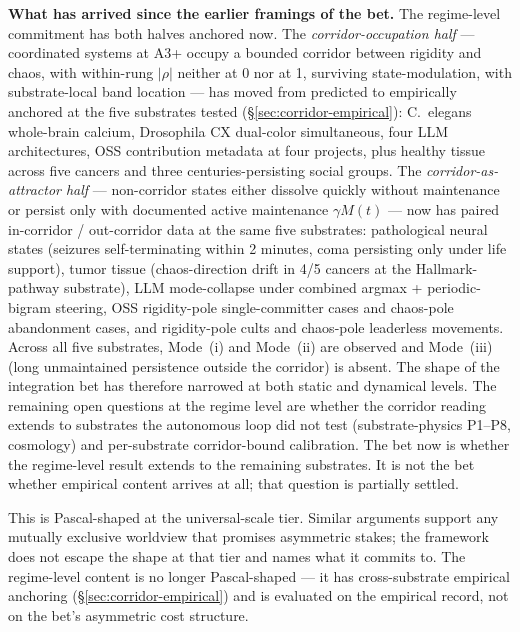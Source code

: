 \documentclass[11pt,a4paper]{article}
\begin{document}
\textbf{What has arrived since the earlier framings of the bet.} The regime-level commitment has both halves anchored now. The \emph{corridor-occupation half} --- coordinated systems at A3+ occupy a bounded corridor between rigidity and chaos, with within-rung $|\rho|$ neither at 0 nor at 1, surviving state-modulation, with substrate-local band location --- has moved from predicted to empirically anchored at the five substrates tested (\S\ref{sec:corridor-empirical}): C.~elegans whole-brain calcium, Drosophila CX dual-color simultaneous, four LLM architectures, OSS contribution metadata at four projects, plus healthy tissue across five cancers and three centuries-persisting social groups. The \emph{corridor-as-attractor half} --- non-corridor states either dissolve quickly without maintenance or persist only with documented active maintenance $\gamma M(t)$ --- now has paired in-corridor / out-corridor data at the same five substrates: pathological neural states (seizures self-terminating within 2 minutes, coma persisting only under life support), tumor tissue (chaos-direction drift in 4/5 cancers at the Hallmark-pathway substrate), LLM mode-collapse under combined argmax + periodic-bigram steering, OSS rigidity-pole single-committer cases and chaos-pole abandonment cases, and rigidity-pole cults and chaos-pole leaderless movements. Across all five substrates, Mode~(i) and Mode~(ii) are observed and Mode~(iii) (long unmaintained persistence outside the corridor) is absent. The shape of the integration bet has therefore narrowed at both static and dynamical levels. The remaining open questions at the regime level are whether the corridor reading extends to substrates the autonomous loop did not test (substrate-physics P1--P8, cosmology) and per-substrate corridor-bound calibration. The bet now is whether the regime-level result extends to the remaining substrates. It is not the bet whether empirical content arrives at all; that question is partially settled.

This is Pascal-shaped at the universal-scale tier. Similar arguments support any mutually exclusive worldview that promises asymmetric stakes; the framework does not escape the shape at that tier and names what it commits to. The regime-level content is no longer Pascal-shaped --- it has cross-substrate empirical anchoring (\S\ref{sec:corridor-empirical}) and is evaluated on the empirical record, not on the bet's asymmetric cost structure.
\end{document}
